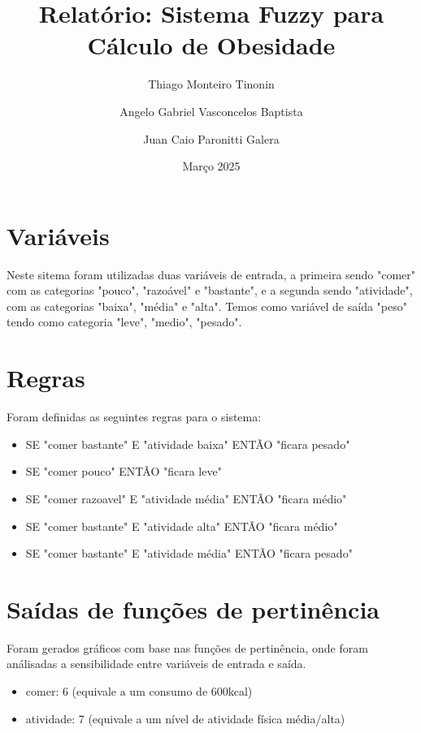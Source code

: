 \documentclass{article}
\title{Relatório: Sistema Fuzzy para Cálculo de Obesidade}
\author{
    Thiago Monteiro Tinonin \\
    \and
    Angelo Gabriel Vasconcelos Baptista \\
    \and
    Juan Caio Paronitti Galera \\
}
\date{Março 2025}
\begin{document}
\maketitle

\section{Variáveis}

Neste sitema foram utilizadas duas variáveis de entrada, a primeira sendo "comer" com as categorias "pouco", "razoável" e "bastante", e a segunda sendo "atividade", com as categorias "baixa", "média" e "alta". Temos como variável de saída "peso" tendo como categoria "leve", "medio", "pesado".

\section{Regras}

Foram definidas as seguintes regras para o sistema:

\begin{itemize}
  \item SE "comer bastante" E "atividade baixa" ENTÃO "ficara pesado"
  \item SE "comer pouco" ENTÃO "ficara leve"
  \item SE "comer razoavel" E "atividade média" ENTÃO "ficara médio"
  \item SE "comer bastante" E "atividade alta" ENTÃO "ficara médio"
  \item SE "comer bastante" E "atividade média" ENTÃO "ficara pesado"
\end{itemize}

\section{Saídas de funções de pertinência}

Foram gerados gráficos com base nas funções de pertinência, onde foram análisadas a sensibilidade entre variáveis de entrada e saída.

\begin{itemize}
  \item comer: 6 (equivale a um consumo de 600kcal)
  \item atividade: 7 (equivale a um nível de atividade física média/alta)
\end{itemize}
\end{document}
